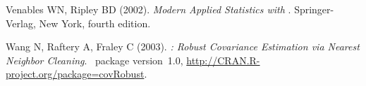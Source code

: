 \documentclass[article,nojss]{jss}
\begin{document}
\begin{thebibliography}{33}
Venables WN, Ripley BD (2002).
\newblock \emph{Modern Applied Statistics with }.
\newblock Springer-Verlag, New York, fourth edition.

Wang N, Raftery A, Fraley C (2003).
\newblock \emph{: Robust Covariance Estimation via Nearest
  Neighbor Cleaning}.
\newblock {}~package version~1.0,
  \urlprefix\url{http://CRAN.R-project.org/package=covRobust}.

\end{thebibliography}
\end{document}

